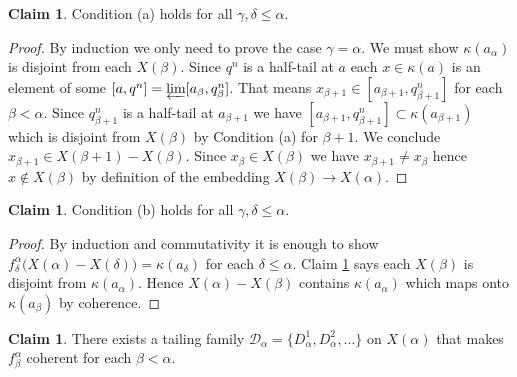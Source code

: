\documentclass[12pt]{article}
\theoremstyle{plain}
\theoremstyle{definition}
\newcounter{claim5counter}
\newtheorem{claim5}[claim5counter]{Claim}
\newcommand{\A}{\ensuremath{\alpha}}
\newcommand{\K}{\ensuremath{\kappa}}
\newcommand{\B}{\ensuremath{\beta}}
\newcommand{\G}{\ensuremath{\gamma}}
\newcommand{\D}{\ensuremath{\delta}}
\newcommand{\0}{\ensuremath{\varnothing}}
\newcommand{\cD}{\ensuremath{\mathcal D}}
\begin{document}
	
	
	\begin{claim5}\label{5a}
		Condition (a) holds for all $\G,\D \le \A$.
	\end{claim5}
	
	\begin{proof}
		
		By induction we only need to prove the case $\G = \A$.
		We must show $\K(a_\A)$ is disjoint from each $X(\B)$.
		Since $q^n$ is a half-tail at $a$ 
		each $x \in \K(a)$ is an element of some $[a,q^n] = \varprojlim [a_\B,q^n_\B]$.
		That means $x_{\B+1} \in [a_{\B+1},q^n_{\B+1}]$ for each $\B < \A$.
		Since $q^n_{\B+1}$ is a half-tail at $a_{\B+1}$ we have $[a_{\B+1},q^n_{\B+1}] \subset \K(a_{\B+1})$
		which is disjoint from $X(\B)$ by Condition (a) for $\B+1$.
		We conclude $x_{\B+1} \in  X(\B+1) - X(\B)$. Since $x_\B \in X(\B)$ we have $x_{\B+1} \ne x_\B$ hence $x \notin X(\B)$ by definition of the embedding $X(\B) \to X(\A)$.
	\end{proof}
	
	
	\begin{claim5}\label{5b}
		Condition (b) holds for all $\G,\D \le \A$.
	\end{claim5}
	
	\begin{proof}
		By induction and commutativity it is enough to show $f^\A_\D \big (X(\A)-X(\D) \big ) = \K(a_\D)$ for each $\D \le \A$. Claim \ref{5a} says each $X(\B)$ is disjoint from $\K(a_\A)$.
		Hence $X(\A) - X(\B)$ contains $\K(a_\A)$ which maps onto $\K(a_\B)$ by coherence.
	\end{proof}
	
	
	\begin{claim5}\label{limtail}
		There exists a tailing family $\cD_{\A} = \{D_{\A}^1, D_{\A}^2 , \ldots \}$ on $X(\A)$ that makes $f^{\A}_\B$ coherent for each $\B < \A$.
	\end{claim5}
	
\end{document}
